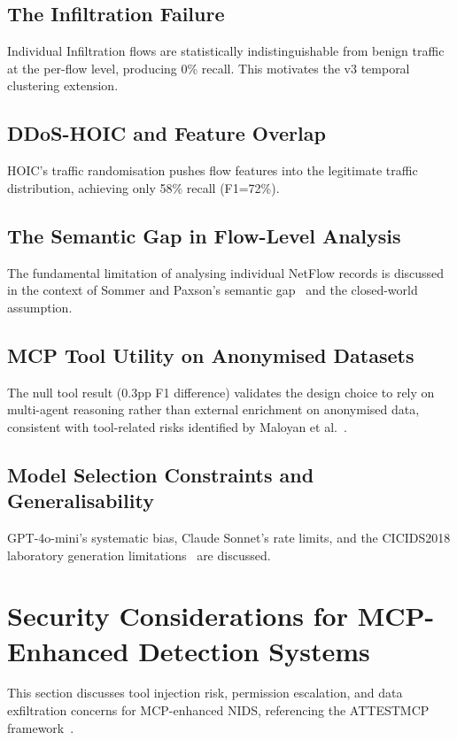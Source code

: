 \documentclass[12pt,openany,oneside,a4paper]{book}
\begin{document}
\subsection{The Infiltration Failure}
Individual Infiltration flows are statistically indistinguishable from benign traffic at the per-flow level, producing 0\% recall. This motivates the v3 temporal clustering extension.

\subsection{DDoS-HOIC and Feature Overlap}
HOIC's traffic randomisation pushes flow features into the legitimate traffic distribution, achieving only 58\% recall (F1=72\%).

\subsection{The Semantic Gap in Flow-Level Analysis}
The fundamental limitation of analysing individual NetFlow records is discussed in the context of Sommer and Paxson's semantic gap~\autocite{Sommer2010} and the closed-world assumption.

\subsection{MCP Tool Utility on Anonymised Datasets}
The null tool result (0.3pp F1 difference) validates the design choice to rely on multi-agent reasoning rather than external enrichment on anonymised data, consistent with tool-related risks identified by Maloyan et al.~\autocite{Maloyan2025}.

\subsection{Model Selection Constraints and Generalisability}
GPT-4o-mini's systematic bias, Claude Sonnet's rate limits, and the CICIDS2018 laboratory generation limitations~\autocite{Kenyon2020, Ring2019} are discussed.

\section{Security Considerations for MCP-Enhanced Detection Systems}
\label{sec:mcp-security}
This section discusses tool injection risk, permission escalation, and data exfiltration concerns for MCP-enhanced NIDS, referencing the ATTESTMCP framework~\autocite{Maloyan2025}.
\end{document}
